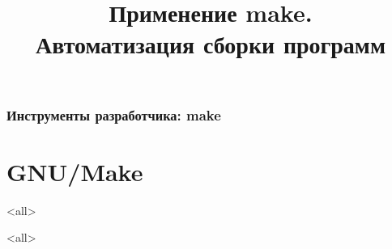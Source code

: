 
\title[make]{Применение make.\\Автоматизация сборки программ}




\begin{frame}
	\frametitle{Инструменты разработчика: make}
	\titlepage
	\vspace{-0.5cm}
	\begin{center}
	\end{center}
\end{frame}

\begin{frame}
	\tableofcontents
\end{frame}



\section{GNU/Make}

\mode<all>{}


\mode<all>

